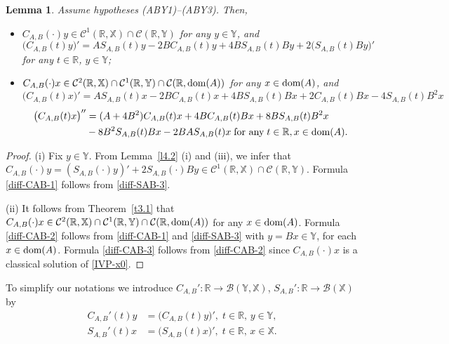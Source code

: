 \documentclass[11pt]{amsart}
\numberwithin{equation}{section}
\newcommand{\SAB}{S_{A,B}}
\newcommand{\CAB}{C_{A,B}}
\newcommand{\RR}{{\mathbb R}}
\newtheorem{lemma}[theorem]{Lemma}
\theoremstyle{remark}
\theoremstyle{definition}
\newcommand\bX{{\mathbb X}}
\newcommand\bY{{\mathbb Y}}
\newcommand{\dom}{\text{\rm{dom}}}
\begin{document}
\begin{lemma}\label{l4.3}
	Assume hypotheses \textnormal{(ABY1)--(ABY3)}. Then,
	\begin{itemize}
		\item[(i)] $\CAB(\cdot)y \in \mathcal{C}^1(\mathbb{R},\bX) \cap \mathcal{C}(\mathbb{R},\bY)$ for any $y \in \bY$, and
		\begin{equation}\label{diff-CAB-1}
			\bigl(\CAB(t)y\bigr)' = A\SAB(t)y - 2BC_{A,B}(t)y + 4B\SAB(t)By + 2\bigl(\SAB(t)By\bigr)' 
		\end{equation}
		for any $t \in \mathbb{R}$, $y \in \bY$;
		\item[(ii)] $\CAB(\cdot)x \in \mathcal{C}^2(\mathbb{R},\bX) \cap \mathcal{C}^1(\mathbb{R},\bY) \cap \mathcal{C}(\mathbb{R},\dom(A))$ for any $x \in \dom(A)$, and
		\begin{equation}\label{diff-CAB-2}
			\bigl(\CAB(t)x\bigr)' = A\SAB(t)x - 2BC_{A,B}(t)x + 4BS_{A,B}(t)Bx + 2\CAB(t)Bx - 4\SAB(t)B^2x 
		\end{equation}
		\begin{align}\label{diff-CAB-3}
			\bigl(\CAB(t)x\bigr)'' &= (A+4B^2)\CAB(t)x + 4BC_{A,B}(t)Bx + 8BS_{A,B}(t)B^2x\nonumber\\& - 8B^2\SAB(t)Bx - 2BA\SAB(t)x\;\mbox{for any}\;t\in\RR, x\in\dom(A). 
		\end{align}
	\end{itemize}
\end{lemma}
\begin{proof}
(i) Fix $y \in\bY$. From Lemma~\ref{l4.2} (i) and (iii), we infer that $\CAB(\cdot)y = (\SAB(\cdot)y)' + 2\SAB(\cdot)By \in \mathcal{C}^1(\mathbb{R},\bX) \cap \mathcal{C}(\mathbb{R},\bY)$. Formula \eqref{diff-CAB-1} follows from \eqref{diff-SAB-3}.
	
(ii) It follows from Theorem~\ref{t3.1}  that $\CAB(\cdot)x \in \mathcal{C}^2(\mathbb{R},\bX) \cap \mathcal{C}^1(\mathbb{R},\bY) \cap \mathcal{C}(\mathbb{R},\dom(A))$ for any $x \in \dom(A)$. Formula \eqref{diff-CAB-2} follows from \eqref{diff-CAB-1} and \eqref{diff-SAB-3} with $y = Bx \in \bY$, for each $x \in \dom(A)$. Formula \eqref{diff-CAB-3} follows from \eqref{diff-CAB-2} since $\CAB(\cdot)x$ is a classical solution of \eqref{IVP-x0}.
\end{proof}
To simplify our notations we introduce $C_{A,B}' : \mathbb{R} \to \mathcal{B}(\bY,\bX)$, $S_{A,B}' : \mathbb{R} \to \mathcal{B}(\bX)$ by
\begin{align}\label{C-S-AB-deriv}
	C_{A,B}'(t)y &= \bigl(\CAB(t)y\bigr)', \; t \in \mathbb{R},\, y \in \bY, \\
	S_{A,B}'(t)x &= \bigl(\SAB(t)x\bigr)', \; t \in \mathbb{R},\, x \in \bX. 
\end{align}
\end{document}

